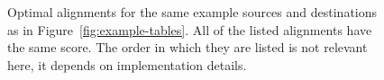 \documentclass[a4paper,10pt]{article}
\begin{document}
\begin{figure}
  \begin{minipage}{80mm}
    \fbox{\begin{minipage}{60mm}
        \footnotesize
        
    \end{minipage}}\\[\baselineskip]
    \fbox{\begin{minipage}{60mm}
        \footnotesize
        
    \end{minipage}}\\[\baselineskip]
    \fbox{\begin{minipage}{60mm}
        \footnotesize
        
    \end{minipage}}
  \end{minipage}
  \fbox{\begin{minipage}{45mm}
      \footnotesize
      
  \end{minipage}}
  \caption{
    Optimal alignments for the same example sources and destinations as in Figure~\ref{fig:example-tables}.
    All of the listed alignments have the same score.
    The order in which they are listed is not relevant here, it depends on implementation details.
  }\label{fig:example-traces}
\end{figure}



\footnotesize


\end{document}
